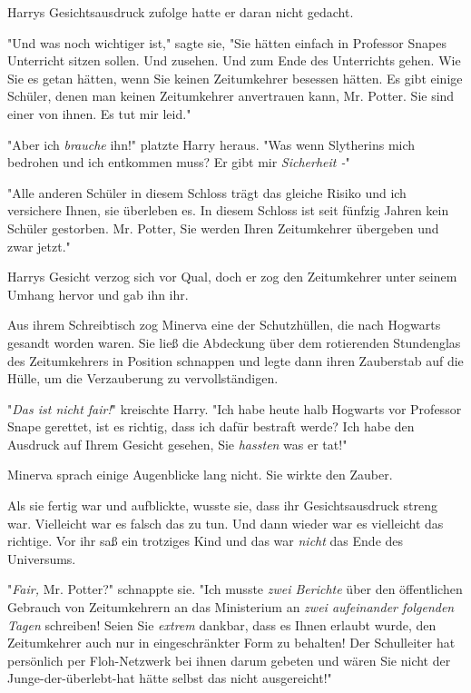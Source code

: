 {Harrys Gesichtsausdruck zufolge hatte er daran nicht gedacht.

"Und was noch wichtiger ist," sagte sie, "Sie hätten einfach in Professor Snapes Unterricht sitzen sollen. Und zusehen. Und zum Ende des Unterrichts gehen. Wie Sie es getan hätten, wenn Sie keinen Zeitumkehrer besessen hätten. Es gibt einige Schüler, denen man keinen Zeitumkehrer anvertrauen kann, Mr. Potter. Sie sind einer von ihnen. Es tut mir leid."

"Aber ich \emph{brauche} ihn!" platzte Harry heraus. "Was wenn Slytherins mich bedrohen und ich entkommen muss? Er gibt mir \emph{Sicherheit -}"

"Alle anderen Schüler in diesem Schloss trägt das gleiche Risiko und ich versichere Ihnen, sie überleben es. In diesem Schloss ist seit fünfzig Jahren kein Schüler gestorben. Mr. Potter, Sie werden Ihren Zeitumkehrer übergeben und zwar jetzt."

Harrys Gesicht verzog sich vor Qual, doch er zog den Zeitumkehrer unter seinem Umhang hervor und gab ihn ihr.

Aus ihrem Schreibtisch zog Minerva eine der Schutzhüllen, die nach Hogwarts gesandt worden waren. Sie ließ die Abdeckung über dem rotierenden Stundenglas des Zeitumkehrers in Position schnappen und legte dann ihren Zauberstab auf die Hülle, um die Verzauberung zu vervollständigen.

"\emph{Das ist nicht fair!}" kreischte Harry. "Ich habe heute halb Hogwarts vor Professor Snape gerettet, ist es richtig, dass ich dafür bestraft werde? Ich habe den Ausdruck auf Ihrem Gesicht gesehen, Sie \emph{hassten} was er tat!"

Minerva sprach einige Augenblicke lang nicht. Sie wirkte den Zauber.

Als sie fertig war und aufblickte, wusste sie, dass ihr Gesichtsausdruck streng war. Vielleicht war es falsch das zu tun. Und dann wieder war es vielleicht das richtige. Vor ihr saß ein trotziges Kind und das war \emph{nicht} das Ende des Universums.

"\emph{Fair,} Mr. Potter?" schnappte sie. "Ich musste \emph{zwei Berichte} über den öffentlichen Gebrauch von Zeitumkehrern an das Ministerium an \emph{zwei aufeinander folgenden Tagen} schreiben! Seien Sie \emph{extrem} dankbar, dass es Ihnen erlaubt wurde, den Zeitumkehrer auch nur in eingeschränkter Form zu behalten! Der Schulleiter hat persönlich per Floh-Netzwerk bei ihnen darum gebeten und wären Sie nicht der Junge-der-überlebt-hat hätte selbst das nicht ausgereicht!"

}
